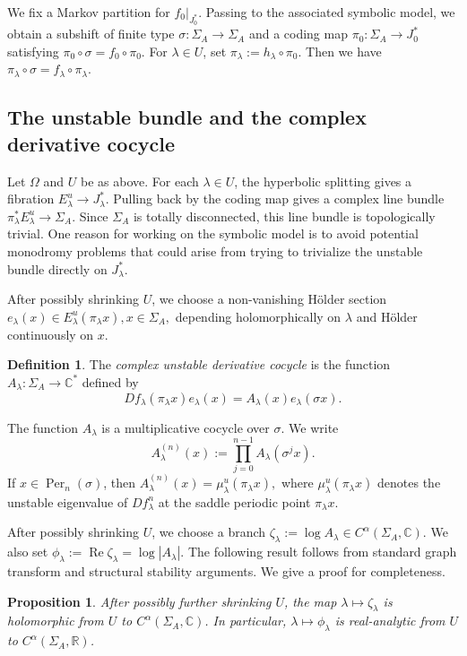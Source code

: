 \documentclass[11pt]{amsart}
\theoremstyle{plain}
\newtheorem{prop}[thm]{Proposition}
\theoremstyle{definition}
\newtheorem{defn}[thm]{Definition}
\theoremstyle{remark}
\begin{document}
We fix a Markov partition for $f_0|_{J_0^\ast}$. Passing to the associated
symbolic model, we obtain a subshift of finite type
$\sigma \colon \Sigma_A\to\Sigma_A$
and a coding map
$\pi_0 \colon \Sigma_A\to J_0^\ast$
satisfying
$\pi_0\circ\sigma=f_0\circ\pi_0$.
For $\lambda\in U$, set
$\pi_\lambda:=h_\lambda\circ\pi_0.$
Then we have
$\pi_\lambda\circ\sigma=f_\lambda\circ\pi_\lambda$.


\subsection{The unstable bundle and the complex derivative cocycle}
Let $\Omega$ and $U$ be as above.
For each $\lambda\in U$, the hyperbolic splitting gives a fibration
$E_\lambda^u\to J_\lambda^\ast.
$
Pulling back by the coding map gives a complex line bundle
$\pi_\lambda^\ast E_\lambda^u\to \Sigma_A.
$
Since $\Sigma_A$ is totally disconnected, this line bundle is topologically
trivial. 
One reason for working
on the symbolic model is to avoid
potential monodromy
problems that could arise from trying to trivialize the unstable
bundle directly on $J^\ast_\lambda$.

After possibly shrinking $U$, we choose a non-vanishing H\"older section
$e_\lambda(x)\in E_\lambda^u(\pi_\lambda x), x\in\Sigma_A,
$
depending holomorphically on $\lambda$ and H\"older continuously on $x$.

\begin{defn}
The {\it complex unstable derivative cocycle} is the function
$A_\lambda \colon \Sigma_A\to\mathbb C^\ast
$
defined by
$$Df_\lambda(\pi_\lambda x)e_\lambda(x)
=A_\lambda(x)e_\lambda(\sigma x).
$$
\end{defn}

The function $A_\lambda$ is a multiplicative cocycle over $\sigma$. We write
$$
A_\lambda^{(n)}(x) :=
\prod_{j=0}^{n-1} A_\lambda(\sigma^j x).
$$
If $x\in\operatorname{Per}_n(\sigma)$, then
$A_\lambda^{(n)}(x) = \mu_\lambda^u(\pi_\lambda x),
$
where $\mu_\lambda^u(\pi_\lambda x)$ denotes the unstable eigenvalue of
$Df_\lambda^n$ at the saddle periodic point $\pi_\lambda x$.

After possibly 
shrinking $U$, we choose a branch
$\zeta_\lambda:=\log A_\lambda\in C^\alpha(\Sigma_A,\mathbb C)$.
We also set
$\phi_\lambda:=\operatorname{Re}\zeta_\lambda=\log |A_\lambda|$. The following result follows from standard 
graph transform and structural stability arguments.
We give a proof for completeness.

\begin{prop}\label{prop:analytic-cocycle}
After possibly further shrinking $U$, the map $\lambda\mapsto \zeta_\lambda$
is holomorphic from $U$ to $C^\alpha(\Sigma_A,\mathbb C)$. In particular,
$\lambda\mapsto \phi_\lambda
$
is real-analytic from $U$ to $C^\alpha(\Sigma_A,\mathbb R)$.
\end{prop}
\end{document}
